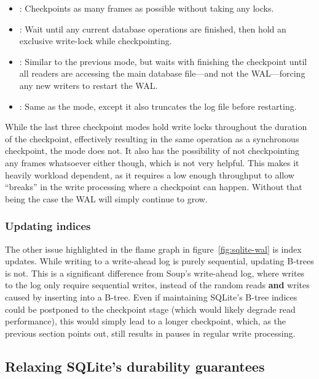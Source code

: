 \begin{itemize}
  \item {}: Checkpoints as many frames as
    possible without taking any locks.
  \item {}: Wait until any current database
    operations are finished, then hold an exclusive write-lock while
    checkpointing.
  \item {}: Similar to the previous mode, but
    waits with finishing the checkpoint until all readers are accessing the
    main database file---and not the WAL---forcing any new writers to restart
    the WAL.\@
  \item {}: Same as the  mode,
    except it also truncates the log file before restarting.
\end{itemize}

While the last three checkpoint modes hold write locks throughout the duration
of the checkpoint, effectively resulting in the same operation as a synchronous
checkpoint, the  mode does not. It also has the possibility of not
checkpointing any frames whatsoever either though, which is not very helpful.
This makes it heavily workload dependent, as it requires a low enough throughput
to allow ``breaks'' in the write processing where a checkpoint can happen. Without
that being the case the WAL will simply continue to grow.

\subsubsection{Updating indices}

The other issue highlighted in the flame graph in
figure~\ref{fig:sqlite-wal} is index updates. While writing to a
write-ahead log is purely sequential, updating B-trees is not. This is a
significant difference from Soup's write-ahead log, where writes to the log only
require sequential writes, instead of the random reads \textbf{and} writes
caused by inserting into a B-tree. Even if maintaining SQLite's B-tree indices
could be postponed to the checkpoint stage (which would likely degrade read
performance), this would simply lead to a longer checkpoint, which, as the
previous section points out, still results in pauses in regular write
processing.

\subsection{Relaxing SQLite's durability guarantees}


